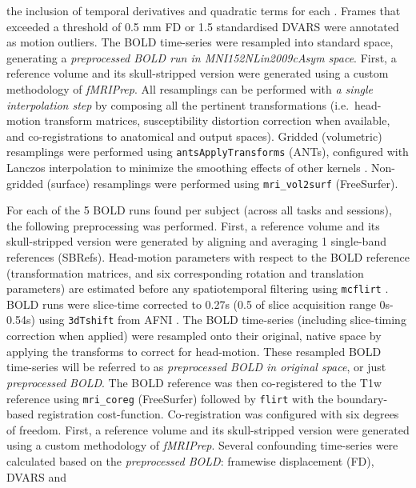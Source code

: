 \documentclass[
]{article}
\begin{document}
\begin{description}
the inclusion of temporal derivatives and quadratic terms for each
\citep{confounds_satterthwaite_2013}. Frames that exceeded a threshold
of 0.5 mm FD or 1.5 standardised DVARS were annotated as motion
outliers. The BOLD time-series were resampled into standard space,
generating a \emph{preprocessed BOLD run in MNI152NLin2009cAsym space}.
First, a reference volume and its skull-stripped version were generated
using a custom methodology of \emph{fMRIPrep}. All resamplings can be
performed with \emph{a single interpolation step} by composing all the
pertinent transformations (i.e.~head-motion transform matrices,
susceptibility distortion correction when available, and
co-registrations to anatomical and output spaces). Gridded (volumetric)
resamplings were performed using \texttt{antsApplyTransforms} (ANTs),
configured with Lanczos interpolation to minimize the smoothing effects
of other kernels \citep{lanczos}. Non-gridded (surface) resamplings were
performed using \texttt{mri\_vol2surf} (FreeSurfer).
\item[Functional data preprocessing]
For each of the 5 BOLD runs found per subject (across all tasks and
sessions), the following preprocessing was performed. First, a reference
volume and its skull-stripped version were generated by aligning and
averaging 1 single-band references (SBRefs). Head-motion parameters with
respect to the BOLD reference (transformation matrices, and six
corresponding rotation and translation parameters) are estimated before
any spatiotemporal filtering using \texttt{mcflirt} \citep[FSL
6.0.5.1:57b01774,][]{mcflirt}. BOLD runs were slice-time corrected to
0.27s (0.5 of slice acquisition range 0s-0.54s) using \texttt{3dTshift}
from AFNI \citep[RRID:SCR\_005927]{afni}. The BOLD time-series
(including slice-timing correction when applied) were resampled onto
their original, native space by applying the transforms to correct for
head-motion. These resampled BOLD time-series will be referred to as
\emph{preprocessed BOLD in original space}, or just \emph{preprocessed
BOLD}. The BOLD reference was then co-registered to the T1w reference
using \texttt{mri\_coreg} (FreeSurfer) followed by \texttt{flirt}
\citep[FSL 6.0.5.1:57b01774,][]{flirt} with the boundary-based
registration \citep{bbr} cost-function. Co-registration was configured
with six degrees of freedom. First, a reference volume and its
skull-stripped version were generated using a custom methodology of
\emph{fMRIPrep}. Several confounding time-series were calculated based
on the \emph{preprocessed BOLD}: framewise displacement (FD), DVARS and

\end{description}
\end{document}
